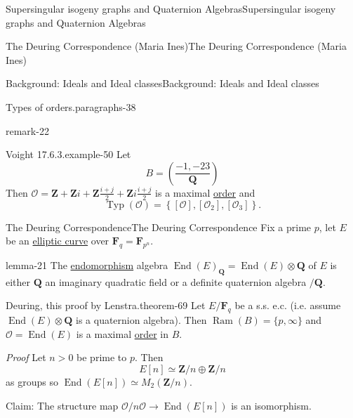 \documentclass[10pt,]{book}
\makeatletter
\renewcommand*{\proofname}{Proof}
\renewenvironment{proof}[1][\proofname]{\par
  \pushQED{\qed}%
  \normalfont \topsep6\p@\@plus6\p@\relax
  \trivlist
  \item\relax
    {\itshape
    #1\@addpunct{.}}\hspace\labelsep\ignorespaces
}{%
  \popQED\endtrivlist\@endpefalse
}
\numberwithin{equation}{section}
\newcommand{\legendre}[2]{\left(\frac{#1}{#2}\right)}
\newcommand{\lb}{[}
\newcommand{\rb}{]}
\newcommand{\ZZ}{\mathbf{Z}}
\newcommand{\QQ}{\mathbf{Q}}
\newcommand{\FF}{\mathbf{F}}
\newcommand{\ints}{\mathcal{O}}
\DeclareMathOperator{\End}{End}
\newcommand{\gt}{>}
\makeatother
\begin{document}
\begin{chapterptx}{Supersingular isogeny graphs and Quaternion Algebras}{}{Supersingular isogeny graphs and Quaternion Algebras}{}{}
\begin{sectionptx}{The Deuring Correspondence (Maria Ines)}{}{The Deuring Correspondence (Maria Ines)}{}{}
\begin{subsectionptx}{Background: Ideals and Ideal classes}{}{Background: Ideals and Ideal classes}{}{}
\begin{paragraphs}{Types of orders.}{paragraphs-38}
\begin{remark}{}{remark-22}
%
\end{remark}
\begin{example}{Voight 17.6.3.}{example-50}%
\hypertarget{p-955}{}%
Let%
\begin{equation*}
B = \legendre{-1,-23}{\QQ}
\end{equation*}
Then \(\ints=  \ZZ +  \ZZ i + \ZZ \frac{i+j}{2} + \ZZ i \frac{i+j}{2}\) is a maximal \hyperref[def-order-quaternion]{order} and%
\begin{equation*}
\operatorname{Typ}(\ints) =  \left\{ \lb \ints \rb , \lb \ints_2 \rb , \lb \ints_3 \rb \right\}\text{.}
\end{equation*}
%
\end{example}
\end{paragraphs}%
\end{subsectionptx}
%
%
\typeout{************************************************}
\typeout{************************************************}
%
\begin{subsectionptx}{The Deuring Correspondence}{}{The Deuring Correspondence}{}{}\label{subsection-76}
\hypertarget{p-956}{}%
Fix a prime \(p\), let \(E\) be an \hyperref[def-supersing-isog-ec]{elliptic curve} over \(\FF_q = \FF_{p^n}\).%
\begin{lemma}{}{}{lemma-21}%
\hypertarget{p-957}{}%
The \hyperref[def-supersing-isog-endo]{endomorphism} algebra  \(\End(E)_\QQ = \End(E) \otimes \QQ\) of \(E\) is either \(\QQ\) an imaginary quadratic field or a definite quaternion algebra \(/\QQ\).%
\end{lemma}
\begin{theorem}{Deuring, this proof by Lenstra.}{}{theorem-69}%
\hypertarget{p-958}{}%
Let \(E/\FF_q\) be a s.s. e.c. (i.e. assume \(\End(E) \otimes \QQ\) is a quaternion algebra). Then \(\operatorname{Ram}(B)  =    \{p, \infty\}\) and \(\ints = \End(E) \) is a maximal \hyperref[def-order-quaternion]{order} in \(B\).%
\end{theorem}
\begin{proof}\hypertarget{proof-107}{}
\hypertarget{p-959}{}%
Let \(n \gt 0\)  be prime to \(p \). Then%
\begin{equation*}
E \lb n \rb  \simeq \ZZ/ n \oplus \ZZ/n
\end{equation*}
as groups so \(\End(E\lb n\rb ) \simeq M_2(\ZZ/n)\).%
\par
\hypertarget{p-960}{}%
Claim: The structure map \(\ints/n\ints  \to \End(E\lb n \rb)\) is an isomorphism.%
\par
\hypertarget{p-961}{}%

\end{proof}
\end{subsectionptx}
\end{sectionptx}
\end{chapterptx}
\end{document}
